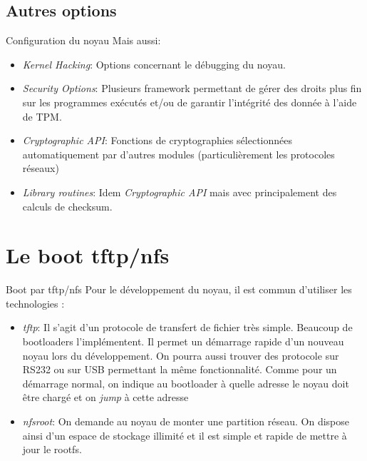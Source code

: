 \subsection{Autres options}

\begin{frame}[fragile=singleslide]{Configuration du noyau}
  Mais aussi:
  \begin{itemize} 
  \item \emph{Kernel  Hacking}:  Options  concernant le  débugging  du
    noyau. %
  \item  \emph{Security  Options}:  Plusieurs framework  permettant  de
    gérer des  droits plus  fin sur les  programmes exécutés  et/ou de
    garantir l'intégrité des donnée à l'aide de TPM.
  \item   \emph{Cryptographic   API}:   Fonctions   de   cryptographies
    sélectionnées     automatiquement     par     d'autres     modules
    (particulièrement les protocoles réseaux)
  \item  \emph{Library routines}: Idem  \emph{Cryptographic API}  mais
    avec principalement des calculs de checksum.
  \end{itemize} 
\end{frame}

\section{Le boot tftp/nfs}

\begin{frame}[fragile=singleslide]{Boot par tftp/nfs}
  Pour  le  développement  du  noyau,  il est  commun  d'utiliser  les
  technologies :
  \begin{itemize}
  \item \emph{tftp}: Il s'agit  d'un protocole de transfert de fichier
    très simple. Beaucoup de  bootloaders l'implémentent. Il permet un
    démarrage  rapide d'un  nouveau noyau  lors du  développement.  On
    pourra aussi trouver des protocole sur RS232 ou sur USB permettant
    la même fonctionnalité. Comme pour un démarrage normal, on indique
    au bootloader  à quelle  adresse le noyau  doit être chargé  et on
    \emph{jump} à cette adresse
  \item \emph{nfsroot}:  On demande au  noyau de monter  une partition
    réseau. On  dispose ainsi d'un  espace de stockage illimité  et il
    est simple et rapide de mettre à jour le rootfs.
  \end{itemize} 
\end{frame} 

